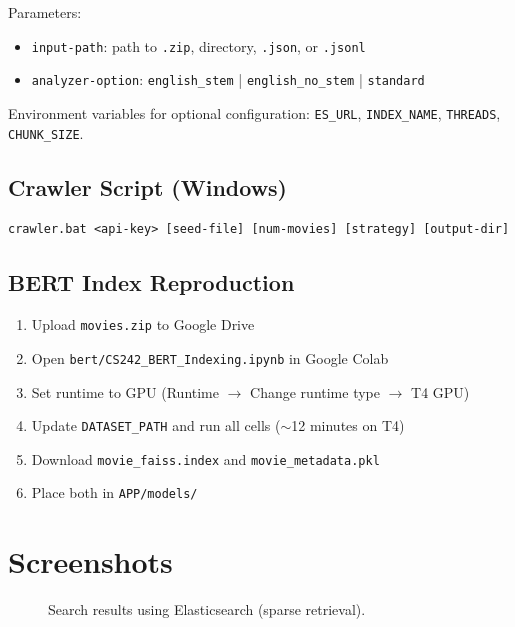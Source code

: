 \documentclass[11pt,a4paper]{article}
\begin{document}
\noindent Parameters:
\begin{itemize}[nosep]
  \item \texttt{input-path}: path to \texttt{.zip}, directory, \texttt{.json}, or \texttt{.jsonl}
  \item \texttt{analyzer-option}: \texttt{english\_stem} | \texttt{english\_no\_stem} | \texttt{standard}
\end{itemize}

\noindent Environment variables for optional configuration: \texttt{ES\_URL}, \texttt{INDEX\_NAME}, \texttt{THREADS}, \texttt{CHUNK\_SIZE}.

\subsection{Crawler Script (Windows)}

\begin{lstlisting}
crawler.bat <api-key> [seed-file] [num-movies] [strategy] [output-dir]
\end{lstlisting}

\subsection{BERT Index Reproduction}

\begin{enumerate}[nosep]
  \item Upload \texttt{movies.zip} to Google Drive
  \item Open \texttt{bert/CS242\_BERT\_Indexing.ipynb} in Google Colab
  \item Set runtime to GPU (Runtime $\to$ Change runtime type $\to$ T4 GPU)
  \item Update \texttt{DATASET\_PATH} and run all cells ($\sim$12 minutes on T4)
  \item Download \texttt{movie\_faiss.index} and \texttt{movie\_metadata.pkl}
  \item Place both in \texttt{APP/models/}
\end{enumerate}

\section{Screenshots}


\begin{figure}[H]
\centering
{}
\caption{Search results using Elasticsearch (sparse retrieval).}
\label{fig:screenshot-es}
\end{figure}
\end{document}

